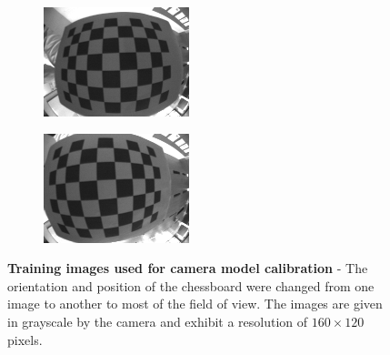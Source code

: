 \begin{figure}[h]
\begin{subfigure}[b]{0.2\textwidth}
    \end{subfigure}
	\begin{subfigure}[b]{0.2\textwidth}
        \centering
        \includegraphics[width=\textwidth]{images/camera/5.png}
    \end{subfigure}
	\begin{subfigure}[b]{0.2\textwidth}
        \centering
        \includegraphics[width=\textwidth]{images/camera/6.png}
    \end{subfigure}
    \caption{\textbf{Training images used for camera model calibration} - The orientation and position of the chessboard were changed from one image to another to most of the field of view. The images are given in grayscale by the camera and exhibit a resolution of $160 \times 120$ pixels.}
    \label{fig:cameraImages}
\end{figure}

